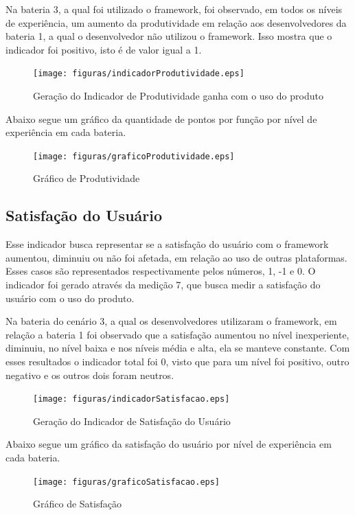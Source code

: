 Na bateria 3, a qual foi utilizado o framework, foi observado, em todos os níveis de experiência, um aumento da
produtividade em relação aos desenvolvedores da bateria 1, a qual o desenvolvedor não utilizou o framework. Isso
mostra que o indicador foi positivo, isto é de valor igual a 1.

\begin{figure}[H]
  \centering
  \label{fig:indicador1}
  \texttt{[image: figuras/indicadorProdutividade.eps]}
  \caption{Geração do Indicador de Produtividade ganha com o uso do produto}
\end{figure}

Abaixo segue um gráfico da quantidade de pontos por função por nível de experiência em cada bateria.

\begin{figure}[H]
  \centering
  \label{fig:graficoIndicador1}
  \texttt{[image: figuras/graficoProdutividade.eps]}
  \caption{Gráfico de Produtividade}
\end{figure}

\subsection{Satisfação do Usuário}

Esse indicador busca representar se a satisfação do usuário com o framework aumentou, diminuiu ou não foi afetada,
em relação ao uso de outras plataformas. Esses casos são representados respectivamente pelos números, 1, -1 e 0.
O indicador foi gerado através da medição 7, que busca medir a satisfação do usuário com o uso do produto.

Na bateria do cenário 3, a qual os desenvolvedores utilizaram o framework, em relação a bateria 1 foi observado que
a satisfação aumentou no nível inexperiente, diminuiu, no nível baixa e nos níveis média e alta, ela se manteve constante.
Com esses resultados o indicador total foi 0, visto que para um nível foi positivo, outro negativo e os outros dois
foram neutros.

\begin{figure}[H]
  \centering
  \label{fig:indicador2}
  \texttt{[image: figuras/indicadorSatisfacao.eps]}
  \caption{Geração do Indicador de Satisfação do Usuário}
\end{figure}

Abaixo segue um gráfico da satisfação do usuário por nível de experiência em cada bateria.

\begin{figure}[H]
  \centering
  \label{fig:graficoIndicador2}
  \texttt{[image: figuras/graficoSatisfacao.eps]}
  \caption{Gráfico de Satisfação}
\end{figure}

